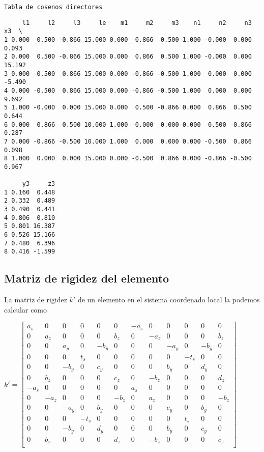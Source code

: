 \documentclass{article}
\begin{document}
    \begin{Verbatim}[commandchars=\\\{\}]
Tabla de cosenos directores
    \end{Verbatim}

    
    \begin{verbatim}
     l1     l2     l3     le    m1     m2     m3    n1     n2     n3     x3  \
1 0.000  0.500 -0.866 15.000 0.000  0.866  0.500 1.000 -0.000  0.000  0.093   
2 0.000  0.500 -0.866 15.000 0.000  0.866  0.500 1.000 -0.000  0.000 15.192   
3 0.000 -0.500  0.866 15.000 0.000 -0.866 -0.500 1.000  0.000  0.000 -5.490   
4 0.000 -0.500  0.866 15.000 0.000 -0.866 -0.500 1.000  0.000  0.000  9.692   
5 1.000 -0.000  0.000 15.000 0.000  0.500 -0.866 0.000  0.866  0.500  0.644   
6 0.000  0.866  0.500 10.000 1.000 -0.000  0.000 0.000  0.500 -0.866  0.287   
7 0.000 -0.866 -0.500 10.000 1.000  0.000  0.000 0.000 -0.500  0.866  0.098   
8 1.000  0.000  0.000 15.000 0.000 -0.500  0.866 0.000 -0.866 -0.500  0.967   

     y3     z3  
1 0.160  0.448  
2 0.332  0.489  
3 0.490  0.441  
4 0.806  0.810  
5 0.801 16.387  
6 0.526 15.166  
7 0.480  6.396  
8 0.416 -1.599  
    \end{verbatim}

    
    \subsection{Matriz de rigidez del
elemento}\label{matriz-de-rigidez-del-elemento}

La matriz de rigidez $k'$ de un elemento en el sistema coordenado local
la podemos calcular como

$k' = \left[\begin{matrix} a_s & 0 & 0 & 0 & 0 & 0 & -a_s & 0 & 0 & 0 & 0 & 0 \\ 0 & a_z & 0 & 0 & 0 & b_z & 0 & -a_z & 0 & 0 & 0 & b_z \\ 0 & 0 & a_y & 0 & -b_y & 0  & 0 & 0 & -a_y & 0 & -b_y & 0 \\ 0 & 0 & 0 & t_s & 0 & 0 & 0 & 0 & 0 & -t_s & 0 & 0 \\ 0 & 0 & -b_y & 0 & c_y & 0 & 0 & 0 & b_y & 0 & d_y & 0 \\ 0 & b_z & 0 & 0 & 0 & c_z & 0 & -b_z & 0 & 0 & 0 & d_z \\ -a_s & 0 & 0 & 0 & 0 & 0 & a_s & 0 & 0 & 0 & 0 & 0 \\ 0 & -a_z & 0 & 0 & 0 & -b_z & 0 & a_z & 0 & 0 & 0 & -b_z \\ 0 & 0 & -a_y & 0 & b_y & 0 & 0 & 0 & c_y & 0 & b_y & 0 \\ 0 & 0 & 0 & -t_s & 0 & 0 & 0 & 0 & 0 & t_s & 0 & 0 \\ 0 & 0 & -b_y & 0 & d_y & 0 & 0 & 0 & b_y & 0 & c_y & 0 \\ 0 & b_z & 0 & 0 & 0 & d_z & 0 & -b_z & 0 & 0 & 0 & c_z \\  \end{matrix}\right]$
\end{document}
